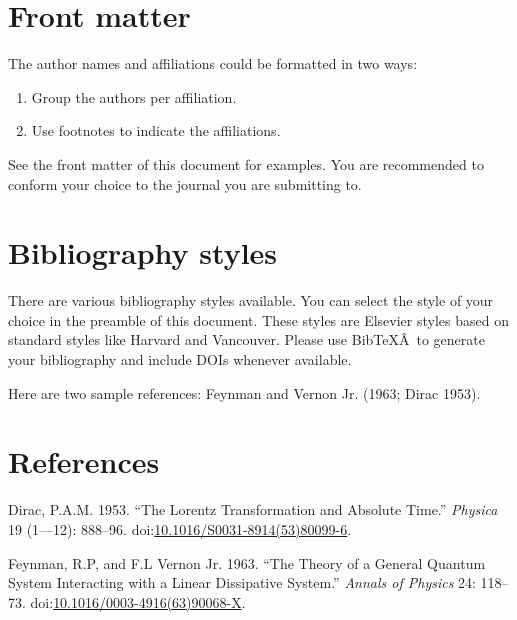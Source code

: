 \documentclass[]{elsarticle} %
\begin{document}
\section{Front matter}\label{front-matter}

The author names and affiliations could be formatted in two ways:

\begin{enumerate}
\def\labelenumi{(\arabic{enumi})}
\item
  Group the authors per affiliation.
\item
  Use footnotes to indicate the affiliations.
\end{enumerate}

See the front matter of this document for examples. You are recommended
to conform your choice to the journal you are submitting to.

\section{Bibliography styles}\label{bibliography-styles}

There are various bibliography styles available. You can select the
style of your choice in the preamble of this document. These styles are
Elsevier styles based on standard styles like Harvard and Vancouver.
Please use BibTeXÂ~to generate your bibliography and include DOIs
whenever available.

Here are two sample references: Feynman and Vernon Jr. (1963; Dirac
1953).

\section*{References}\label{references}

\hypertarget{refs}{}
\hypertarget{ref-Dirac1953888}{}
Dirac, P.A.M. 1953. ``The Lorentz Transformation and Absolute Time.''
\emph{Physica} 19 (1---12): 888--96.
doi:\href{https://doi.org/10.1016/S0031-8914(53)80099-6}{10.1016/S0031-8914(53)80099-6}.

\hypertarget{ref-Feynman1963118}{}
Feynman, R.P, and F.L Vernon Jr. 1963. ``The Theory of a General Quantum
System Interacting with a Linear Dissipative System.'' \emph{Annals of
Physics} 24: 118--73.
doi:\href{https://doi.org/10.1016/0003-4916(63)90068-X}{10.1016/0003-4916(63)90068-X}.
\end{document}
